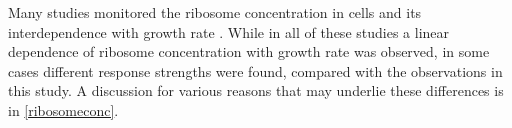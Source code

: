 Many studies monitored the ribosome concentration in cells and its interdependence with growth rate \cite{Scott2010, Bremer1987, Schaechter1958, 1974, Zaslaver2009, eco-sal}.
While in all of these studies a linear dependence of ribosome concentration with growth rate was observed, in some cases different response strengths were found, compared with the observations in this study.
A discussion for various reasons that may underlie these differences is in \ref{ribosomeconc}.
